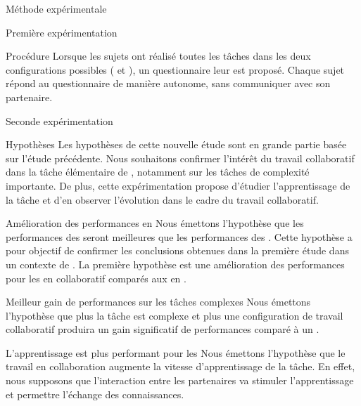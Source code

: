\documentclass[myfrancais,ngerman,english,frenchb]{mythesis}
\begin{document}
\begin{mychapter}{Méthode expérimentale}
\begin{mysection}{Première expérimentation}
\begin{mysubsection}{Procédure}
				Lorsque les sujets ont réalisé toutes les tâches dans les deux configurations possibles ( et ), un questionnaire leur est proposé.
				Chaque sujet répond au questionnaire de manière autonome, sans communiquer avec son partenaire.
			\end{mysubsection}
		\end{mysection}
		\begin{mysection}{Seconde expérimentation}
			\begin{mysubsection}{Hypothèses}
				Les hypothèses de cette nouvelle étude sont en grande partie basée sur l'étude précédente.
				Nous souhaitons confirmer l'intérêt du travail collaboratif dans la tâche élémentaire de , notamment sur les tâches de complexité importante.
				De plus, cette expérimentation propose d'étudier l'apprentissage de la tâche et d'en observer l'évolution dans le cadre du travail collaboratif.
				\begin{myparagraph}{ Amélioration des performances en }
					Nous émettons l'hypothèse que les performances des  seront meilleures que les performances des .
					Cette hypothèse a pour objectif de confirmer les conclusions obtenues dans la première étude dans un contexte de .
					La première hypothèse est une amélioration des performances pour les  en collaboratif comparés aux  en .
				\end{myparagraph}
				\begin{myparagraph}{ Meilleur gain de performances sur les tâches complexes}
					Nous émettons l'hypothèse que plus la tâche est complexe et plus une configuration de travail collaboratif produira un gain significatif de performances comparé à un .
				\end{myparagraph}
				\begin{myparagraph}{ L'apprentissage est plus performant pour les }
					Nous émettons l'hypothèse que le travail en collaboration augmente la vitesse d'apprentissage de la tâche.
					En effet, nous supposons que l'interaction entre les partenaires va stimuler l'apprentissage et permettre l'échange des connaissances.

\end{myparagraph}
\end{mysubsection}
\end{mysection}
\end{mychapter}
\end{document}
